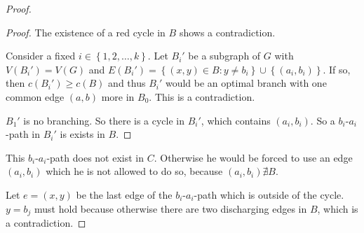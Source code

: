 \documentclass{article}
\newcommand{\set}[1]{\left\{#1\right\}}
\newcommand{\gath}[2]{$#1$-$#2$-path} %
\begin{document}
\begin{proof}
\begin{proof}
The existence of a red cycle in $B$ shows a contradiction.

Consider a fixed $i \in \set{1, 2, \ldots, k}$.
Let $B_i'$ be a subgraph of $G$ with $V(B_i') = V(G)$ and $E(B_i') = \set{(x, y) \in B: y \neq b_i} \cup \set{(a_i, b_i)}$. If so, then $c(B_i') \geq c(B)$ and thus $B_i'$ would be an optimal branch with one common edge $(a, b)$ more in $B_0$. This is a contradiction.

$B_1'$ is no branching. So there is a cycle in $B_i'$, which contains $(a_i, b_i)$. So a \gath{b_i}{a_i} in $B_i'$ is exists in $B$.
\end{proof}

This \gath{b_i}{a_i} does not exist in $C$. Otherwise he would be forced to use an edge $(a_i, b_i)$ which he is not allowed to do so, because $(a_i, b_i) \nexists B$.

Let $e = (x, y)$ be the last edge of the \gath{b_i}{a_i} which is outside of the cycle. $y = b_j$ must hold because otherwise there are two discharging edges in $B$, which is a contradiction.


\end{proof}
\end{document}
